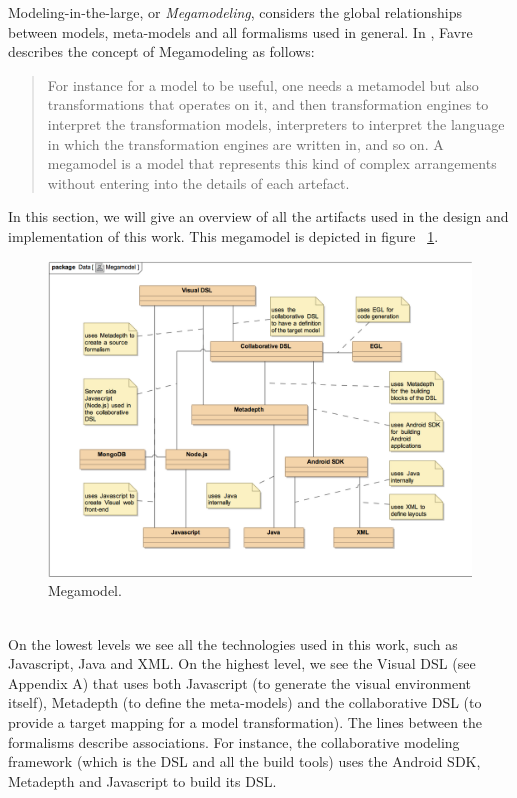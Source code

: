 Modeling-in-the-large, or \textit{Megamodeling}, considers the global relationships between models, meta-models and all formalisms used in general. In \cite{Megamodeling}, Favre describes the concept of Megamodeling as follows:
\begin{quotation}
For instance for a model to be useful, one needs a metamodel but also transformations that operates on it, and then transformation engines to interpret the transformation models, interpreters to interpret the language in which the transformation engines are written in, and so on. A megamodel is a model that represents this kind of complex arrangements without entering into the details of each artefact.
\end{quotation}
In this section, we will give an overview of all the artifacts used in the design and implementation of this work. This megamodel is depicted in figure ~\ref{fig:megamodel}.
\begin{figure}[h!]
\centering
\includegraphics[width=1.02\textwidth]{images/chap6_megamodel.png}
\caption{Megamodel.}
\label{fig:megamodel}
\end{figure} \\
On the lowest levels we see all the technologies used in this work, such as Javascript, Java and XML.  On the highest level, we see the Visual DSL (see Appendix A) that uses both Javascript (to generate the visual environment itself), Metadepth (to define the meta-models) and the collaborative DSL (to provide a target mapping for a model transformation). The lines between the formalisms describe associations. For instance, the collaborative modeling framework (which is the DSL and all the build tools) uses the Android SDK, Metadepth and Javascript to build its DSL.

